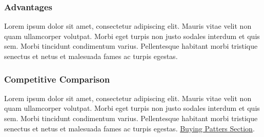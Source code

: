 \documentclass[11pt,a4paper,titlepage]{article}
\begin{document}
\subsubsection{Advantages}
Lorem ipsum dolor sit amet, consectetur adipiscing elit. Mauris vitae velit 
non quam ullamcorper volutpat. Morbi eget turpis non justo sodales interdum 
et quis sem. Morbi tincidunt condimentum varius. Pellentesque habitant morbi 
tristique senectus et netus et malesuada fames ac turpis egestas.\newline
\subsubsection{Competitive Comparison}
Lorem ipsum dolor sit amet, consectetur adipiscing elit. Mauris vitae velit 
non quam ullamcorper volutpat. Morbi eget turpis non justo sodales interdum 
et quis sem. Morbi tincidunt condimentum varius. Pellentesque habitant morbi 
tristique senectus et netus et malesuada fames ac turpis egestas.\newline
\hyperlink{competition_and_buying_patterns}{Buying Patters Section}.\newline\newline
\end{document}
